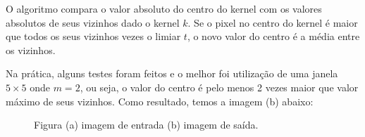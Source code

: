 \documentclass{article}
\begin{document}
	O algoritmo compara o valor absoluto do centro do kernel com os valores absolutos de seus vizinhos dado o kernel $k$. Se o pixel no centro do kernel é maior que todos os seus vizinhos vezes o limiar $t$, o novo valor do centro é a média entre os vizinhos.
	
	Na prática, alguns testes foram feitos e o melhor foi utilização de uma janela $5 \times 5$ onde $m=2$, ou seja, o valor do centro é pelo menos 2 vezes maior que valor máximo de seus vizinhos. Como resultado, temos a imagem (b) abaixo:
	
	\begin{figure}[H]
		\centering
		\qquad
		\caption{Figura (a) imagem de entrada (b) imagem de saída.} 
		
	\end{figure}
	
\end{document}
